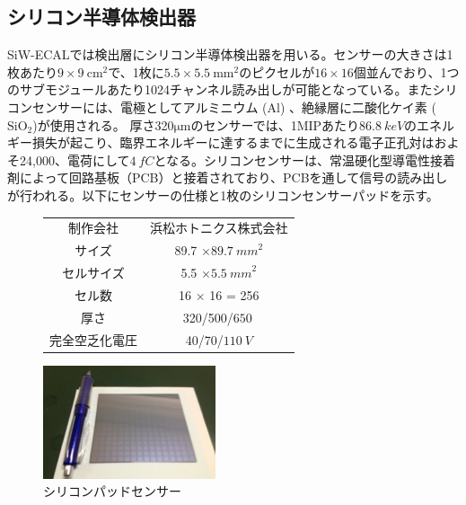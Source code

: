\subsection{シリコン半導体検出器}
SiW-ECALでは検出層にシリコン半導体検出器を用いる。センサーの大きさは1枚あたり$9 \times 9\: \mathrm{{cm}^2}$で、1枚に$5.5 \times 5.5\: {\mathrm{mm}^2}$のピクセルが$16 \times 16$個並んでおり、1つのサブモジュールあたり1024チャンネル読み出しが可能となっている。またシリコンセンサーには、電極としてアルミニウム ($\mathrm{Al}$) 、絶縁層に二酸化ケイ素 ($\mathrm{SiO_2}$)が使用される。 厚さ320$\mathrm{\mu m}$のセンサーでは、1MIPあたり$\SI{86.8}{keV}$のエネルギー損失が起こり、臨界エネルギーに達するまでに生成される電子正孔対はおよそ24,000、電荷にして$\SI{4}{fC}$となる。シリコンセンサーは、常温硬化型導電性接着剤によって回路基板（PCB）と接着されており、PCBを通して信号の読み出しが行われる。以下にセンサーの仕様と1枚のシリコンセンサーパッドを示す。
\begin{figure}[H]
 \begin{minipage}[h]{.45\linewidth}
 \def\@captype{table}
   \centering
   \begin{tabular}{|c|c|}
         \hline
   	制作会社 & 浜松ホトニクス株式会社\\
	サイズ & 89.7 $\times \SI{89.7}{mm}^2 $ \\
	セルサイズ & 5.5 $\times \SI{5.5}{mm}^2 $\\
	セル数 & 16 $\times$ 16 = 256\\
	厚さ & 320/500/$\SI{650}{}$\\
	完全空乏化電圧 & 40/70/$\SI{110}{V}$\\
        \hline
  \end{tabular}
\end{minipage}
\hfill
\begin{minipage}[h]{.45\linewidth}
	\begin{center}
 \includegraphics[keepaspectratio, scale=0.8]
 	{Figure/Siwecal/si_sensor.png}
 		\caption{シリコンパッドセンサー}
 		\label{sensor}
	\end{center}
\end{minipage}
\end{figure}
